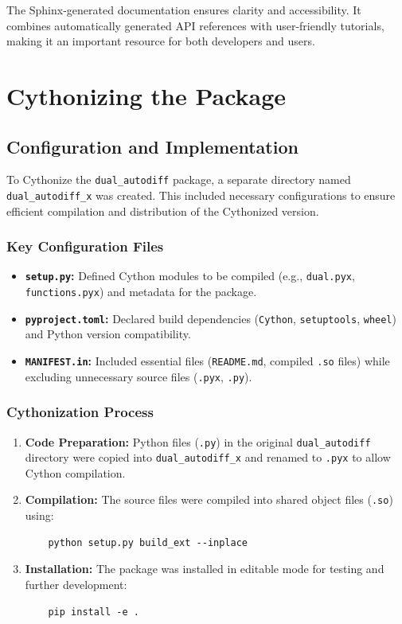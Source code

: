 \documentclass[a4paper,12pt]{article}
\begin{document}
The Sphinx-generated documentation ensures clarity and accessibility. It combines automatically generated API references with user-friendly tutorials, making it an important resource for both developers and users.

\section{Cythonizing the Package}

\subsection{Configuration and Implementation}
To Cythonize the \texttt{dual\_autodiff} package, a separate directory named \texttt{dual\_autodiff\_x} was created. This included necessary configurations to ensure efficient compilation and distribution of the Cythonized version.

\subsubsection{Key Configuration Files}
\begin{itemize}
    \item \textbf{\texttt{setup.py}:} Defined Cython modules to be compiled (e.g., \texttt{dual.pyx}, \texttt{functions.pyx}) and metadata for the package.
    \item \textbf{\texttt{pyproject.toml}:} Declared build dependencies (\texttt{Cython}, \texttt{setuptools}, \texttt{wheel}) and Python version compatibility.
    \item \textbf{\texttt{MANIFEST.in}:} Included essential files (\texttt{README.md}, compiled \texttt{.so} files) while excluding unnecessary source files (\texttt{.pyx}, \texttt{.py}).
\end{itemize}

\subsubsection{Cythonization Process}
\begin{enumerate}
    \item \textbf{Code Preparation:} 
    Python files (\texttt{.py}) in the original \texttt{dual\_autodiff} directory were copied into \texttt{dual\_autodiff\_x} and renamed to \texttt{.pyx} to allow Cython compilation.
    
    \item \textbf{Compilation:} 
    The source files were compiled into shared object files (\texttt{.so}) using:
    \begin{verbatim}
    python setup.py build_ext --inplace
    \end{verbatim}
    
    \item \textbf{Installation:} 
    The package was installed in editable mode for testing and further development:
    \begin{verbatim}
    pip install -e .
    \end{verbatim}
\end{enumerate}
\end{document}
